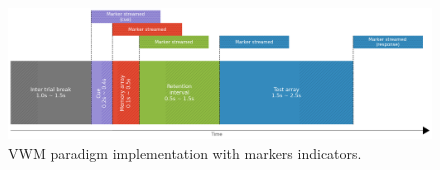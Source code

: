 \begin{figure}[H]
\begin{centering}
% 
\includegraphics[width=1\textwidth]{Appendix/databases/Figures/vwm-paradigm.png}
\par\end{centering}
\caption{\gls*{VWM} paradigm implementation with markers indicators.}
\label{}
\end{figure}